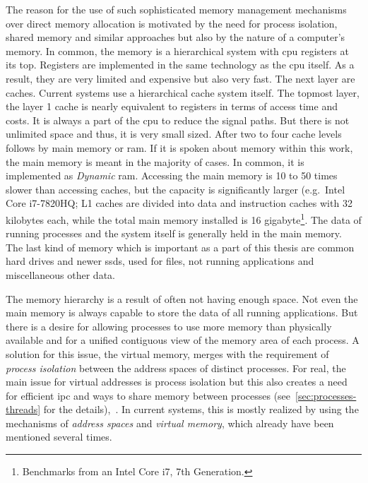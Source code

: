 The reason for the use of such sophisticated memory management mechanisms over direct memory allocation is motivated by the need for process isolation, shared memory and similar approaches but also by the nature of a computer's memory.
In common, the memory is a hierarchical system with \ac{cpu} registers at its top.
Registers are implemented in the same technology as the \ac{cpu} itself. 
As a result, they are very limited and expensive but also very fast.
The next layer are caches.
Current systems use a hierarchical cache system itself.
The topmost layer, the layer 1 cache is nearly equivalent to registers in terms of access time and costs\cite{tanenbaum-modern-operating-systems}.
It is always a part of the \ac{cpu} to reduce the signal paths.
But there is not unlimited space and thus, it is very small sized\cite{tanenbaum-modern-operating-systems}.
After two to four cache levels follows by main memory or \ac{ram}.
If it is spoken about memory within this work, the main memory is meant in the majority of cases.
In common, it is implemented as \textit{Dynamic} \ac{ram}.
Accessing the main memory is 10 to 50 times slower than accessing caches, but the capacity is significantly larger (e.g.\ Intel Core i7-7820HQ; L1 caches are divided into data and instruction caches with 32 kilobytes each, while the total main memory installed is 16 gigabyte\footnote{Benchmarks from an Intel Core i7, 7th Generation.}\cite{mandl2014Grundkurs}.
The data of running processes and the system itself is generally held in the main memory.
The last kind of memory which is important as a part of this thesis are common hard drives and newer \acp{ssd}, used for files, not running applications and miscellaneous other data.

The memory hierarchy is a result of often not having enough space.
Not even the main memory is always capable to store the data of all running applications. 
But there is a desire for allowing processes to use more memory than physically available and for a unified contiguous view of the memory area of each process.
A solution for this issue, the virtual memory, merges with the requirement of \textit{process isolation} between the address spaces of distinct processes.
For real, the main issue for virtual addresses is process isolation but this also creates a need for efficient \acf{ipc} and ways to share memory between processes (see~\ref{sec:processes-threads} for the details)\cite{mandl2014Grundkurs},~\cite{brause2017betriebssysteme}.
In current systems, this is mostly realized by using the mechanisms of \textit{address spaces} and \textit{virtual memory}, which already have been mentioned several times.


